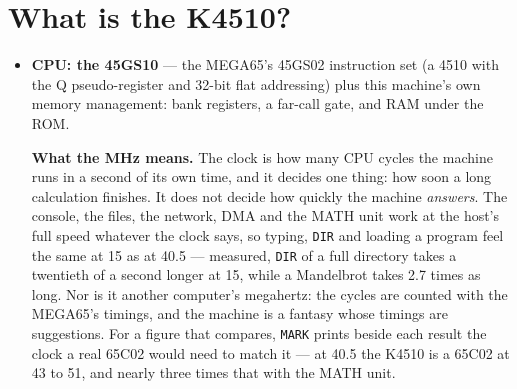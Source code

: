 \section{What is the K4510?}
\begin{itemize}[leftmargin=1.4em]
\item \textbf{CPU: the 45GS10} --- the MEGA65's 45GS02 instruction set (a
  4510 with the Q pseudo-register and 32-bit flat addressing) plus this
  machine's own memory management: bank registers, a far-call gate, and RAM
  under the ROM.

  \textbf{What the MHz means.} The clock is how many CPU cycles the
  machine runs in a second of its own time, and it decides one thing: how
  soon a long calculation finishes. It does not decide how quickly the
  machine \emph{answers}. The console, the files, the network, DMA and
  the MATH unit work at the host's full speed whatever the clock says, so
  typing, \verb|DIR| and loading a program feel the same at 15 as at
  40.5 --- measured, \verb|DIR| of a full directory takes a twentieth of
  a second longer at 15, while a Mandelbrot takes 2.7 times as long.
  Nor is it another computer's megahertz: the cycles are counted with
  the MEGA65's timings, and the machine is a fantasy whose timings are
  suggestions. For a figure that compares, \verb|MARK| prints beside
  each result the clock a real 65C02 would need to match it --- at 40.5
  the K4510 is a 65C02 at 43 to 51, and nearly three times that with the MATH
  unit.


\end{itemize}
